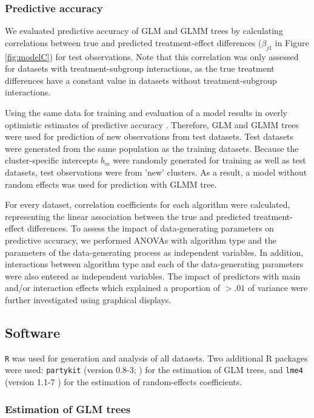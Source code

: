 \documentclass[nobf,doc]{apa}
\begin{document}
\subsubsection{Predictive accuracy} 

We evaluated predictive accuracy of GLM and GLMM trees by calculating correlations between true and predicted treatment-effect differences ($\beta_{j1}$ in Figure \ref{fig:modelC}) for test observations. Note that this correlation was only assessed for datasets with treatment-subgroup interactions, as the true treatment differences have a constant value in datasets without treatment-subgroup interactions.

Using the same data for training and evaluation of a model results in overly optimistic estimates of predictive accuracy \cite{HastyTibs09}. Therefore, GLM and GLMM trees were used for prediction of new observations from test datasets. Test datasets were generated from the same population as the training datasets. Because the cluster-specific intercepts $b_m$ were randomly generated for training as well as test datasets, test observations were from 'new' clusters. As a result, a model without random effects was used for prediction with GLMM tree.

For every dataset, correlation coefficients for each algorithm were calculated, representing the linear association between the true and predicted treatment-effect differences. To assess the impact of data-generating parameters on predictive accuracy, we performed ANOVAs with algorithm type and the parameters of the data-generating process as independent variables. In addition, interactions between algorithm type and each of the data-generating parameters were also entered as independent variables. The impact of predictors with main and/or interaction effects which explained a proportion of $> .01$ of variance were further investigated using graphical displays.


\subsection{Software}

\verb|R| \cite{R14} was used for generation and analysis of all datasets. Two additional R packages were used: \verb|partykit| (version 0.8-3; ) for the estimation of GLM trees, and \verb|lme4| (version 1.1-7 ) for the estimation of random-effects coefficients. 


\subsubsection{Estimation of GLM trees}
\end{document}
